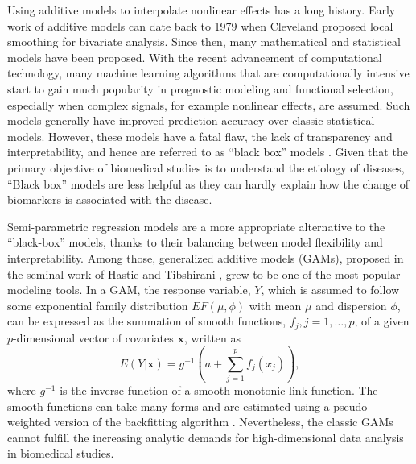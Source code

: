 \documentclass[AMA,STIX1COL,]{WileyNJD-v2}
\begin{document}
\label{sec:intro}

Using additive models to interpolate nonlinear effects has a long
history. Early work of additive models can date back to 1979 when
Cleveland \citep{Cleveland1979} proposed local smoothing for bivariate
analysis. Since then, many mathematical and statistical models have been
proposed. \citep{Wood2020} With the recent advancement of computational
technology, many machine learning algorithms that are computationally
intensive start to gain much popularity in prognostic modeling and
functional selection, especially when complex signals, for example
nonlinear effects, are assumed. Such models generally have improved
prediction accuracy over classic statistical models. However, these
models have a fatal flaw, the lack of transparency and interpretability,
and hence are referred to as ``black box'' models \citep{Breiman2001}.
Given that the primary objective of biomedical studies is to understand
the etiology of diseases, ``Black box'' models are less helpful as they
can hardly explain how the change of biomarkers is associated with the
disease.

Semi-parametric regression models are a more appropriate alternative to
the ``black-box'' models, thanks to their balancing between model
flexibility and interpretability. Among those, generalized additive
models (GAMs), proposed in the seminal work of Hastie and Tibshirani
\citep{Hastie1987}, grew to be one of the most popular modeling tools.
In a GAM, the response variable, \(Y\), which is assumed to follow some
exponential family distribution \(EF(\mu, \phi)\) with mean \(\mu\) and
dispersion \(\phi\), can be expressed as the summation of smooth
functions, \(f_j, j = 1, \dots, p\), of a given \(p\)-dimensional vector
of covariates \(\boldsymbol{x}\), written as \[
 E(Y|\boldsymbol{x}) = g^{-1}(a + \sum\limits^p_{j=1}f_j(x_j)),
\] where \(g^{-1}\) is the inverse function of a smooth monotonic link
function. The smooth functions can take many forms and are estimated
using a pseudo-weighted version of the backfitting algorithm
\citep{Breiman1985}. Nevertheless, the classic GAMs cannot fulfill the
increasing analytic demands for high-dimensional data analysis in
biomedical studies.
\end{document}
